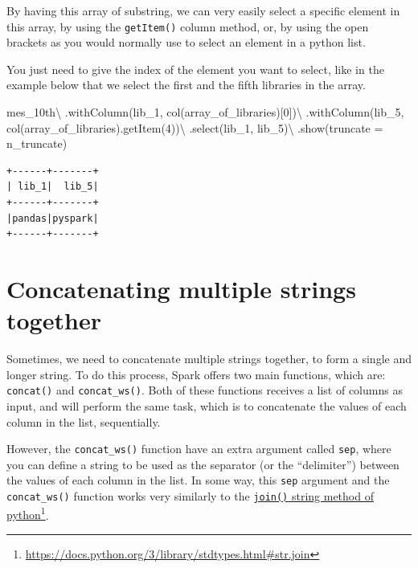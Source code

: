 \documentclass[
  11pt,
  letterpaper,
  DIV=11,
  numbers=noendperiod]{scrreprt}
\newenvironment{Shaded}{\begin{snugshade}}{\end{snugshade}}
\newcommand{\DecValTok}[1]{\textcolor[rgb]{0.68,0.00,0.00}{#1}}
\newcommand{\NormalTok}[1]{\textcolor[rgb]{0.00,0.23,0.31}{#1}}
\newcommand{\OperatorTok}[1]{\textcolor[rgb]{0.37,0.37,0.37}{#1}}
\newcommand{\StringTok}[1]{\textcolor[rgb]{0.13,0.47,0.30}{#1}}
\begin{document}
By having this array of substring, we can very easily select a specific
element in this array, by using the \texttt{getItem()} column method,
or, by using the open brackets as you would normally use to select an
element in a python list.

You just need to give the index of the element you want to select, like
in the example below that we select the first and the fifth libraries in
the array.

\begin{Shaded}
\begin{Highlighting}[]
\NormalTok{mes\_10th}\OperatorTok{\textbackslash{}}
\NormalTok{    .withColumn(}\StringTok{\textquotesingle{}lib\_1\textquotesingle{}}\NormalTok{, col(}\StringTok{\textquotesingle{}array\_of\_libraries\textquotesingle{}}\NormalTok{)[}\DecValTok{0}\NormalTok{])}\OperatorTok{\textbackslash{}}
\NormalTok{    .withColumn(}\StringTok{\textquotesingle{}lib\_5\textquotesingle{}}\NormalTok{, col(}\StringTok{\textquotesingle{}array\_of\_libraries\textquotesingle{}}\NormalTok{).getItem(}\DecValTok{4}\NormalTok{))}\OperatorTok{\textbackslash{}}
\NormalTok{    .select(}\StringTok{\textquotesingle{}lib\_1\textquotesingle{}}\NormalTok{, }\StringTok{\textquotesingle{}lib\_5\textquotesingle{}}\NormalTok{)}\OperatorTok{\textbackslash{}}
\NormalTok{    .show(truncate }\OperatorTok{=}\NormalTok{ n\_truncate)}
\end{Highlighting}
\end{Shaded}

\begin{verbatim}
+------+-------+
| lib_1|  lib_5|
+------+-------+
|pandas|pyspark|
+------+-------+
\end{verbatim}

\hypertarget{concatenating-multiple-strings-together}{%
\section{Concatenating multiple strings
together}\label{concatenating-multiple-strings-together}}

Sometimes, we need to concatenate multiple strings together, to form a
single and longer string. To do this process, Spark offers two main
functions, which are: \texttt{concat()} and \texttt{concat\_ws()}. Both
of these functions receives a list of columns as input, and will perform
the same task, which is to concatenate the values of each column in the
list, sequentially.

However, the \texttt{concat\_ws()} function have an extra argument
called \texttt{sep}, where you can define a string to be used as the
separator (or the ``delimiter'') between the values of each column in
the list. In some way, this \texttt{sep} argument and the
\texttt{concat\_ws()} function works very similarly to the
\href{https://docs.python.org/3/library/stdtypes.html\#str.join}{\texttt{join()}
string method of python}\footnote{\url{https://docs.python.org/3/library/stdtypes.html\#str.join}}.
\end{document}
